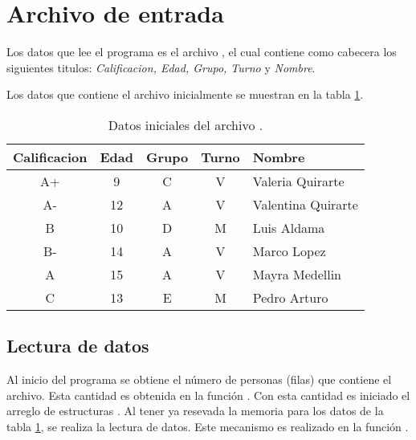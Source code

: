 \section{Archivo de entrada}

Los datos que lee el programa es el archivo , el cual contiene como cabecera los siguientes titulos: \textit{Calificacion, Edad, Grupo, Turno} y \textit{Nombre}.

Los datos que contiene el archivo inicialmente se muestran en la tabla \ref{table:initial_data}.

\begin{table}[H]
    \centering
    \begin{tabular}{ccccl} \hline
        Calificacion & Edad & Grupo & Turno & Nombre             \\ \hline
        A+           & 9    & C     & V     & Valeria Quirarte   \\
        A-           & 12   & A     & V     & Valentina Quirarte \\
        B            & 10   & D     & M     & Luis Aldama        \\
        B-           & 14   & A     & V     & Marco Lopez        \\
        A            & 15   & A     & V     & Mayra Medellin     \\
        C            & 13   & E     & M     & Pedro Arturo       \\ \hline
    \end{tabular}
    \caption{Datos iniciales del archivo .}
    \label{table:initial_data}
\end{table}

\subsection{Lectura de datos}

Al inicio del programa se obtiene el número de personas (filas) que contiene el archivo. Esta cantidad es obtenida en la función . Con esta cantidad es iniciado el arreglo de estructuras . Al tener ya resevada la memoria para los datos de la tabla \ref{table:initial_data}, se realiza la lectura de datos. Este mecanismo es realizado en la función .